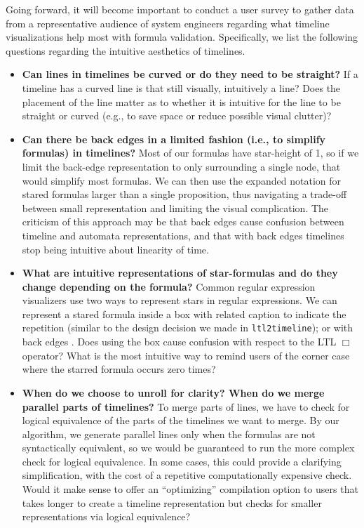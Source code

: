 \documentclass[preprint,12pt]{elsarticle}
\theoremstyle{definition}
\theoremstyle{remark}
\newcommand{\tool}{\hspace{0.1cm}\texttt{ltl2timeline}\hspace{0.1cm}}
\begin{document}
Going forward, it will become important to conduct a user survey to gather data from a representative audience of system engineers regarding what timeline visualizations help most with formula validation. Specifically, we list the following questions regarding the intuitive aesthetics of timelines.
\begin{itemize}
\item {\bf Can lines in timelines be curved or do they need to be straight?} If a timeline has a curved line is that still visually, intuitively a line? Does the placement of the line matter as to whether it is intuitive for the line to be straight or curved (e.g., to save space or reduce possible visual clutter)?

\item {\bf Can there be back edges in a limited fashion (i.e., to simplify formulas) in timelines?} Most of our formulas have star-height of 1, so if we limit the back-edge representation to only surrounding a single node, that would simplify most formulas. We can then use the expanded notation for stared formulas larger than a single proposition, thus navigating a trade-off between small representation and limiting the visual complication. The criticism of this approach may be that back edges cause confusion between timeline and automata representations, and that with back edges timelines stop being intuitive about linearity of time.

\item {\bf What are intuitive representations of star-formulas and do they change depending on the formula?} Common regular expression visualizers use two ways to represent stars in regular expressions. We can represent a stared formula inside a box \cite{B22} with related caption to indicate the repetition (similar to the design decision we made in \tool); or with back edges \cite{A20}. Does using the box cause confusion with respect to the LTL $\Box$ operator? What is the most intuitive way to remind users of the corner case where the starred formula occurs zero times?

\item {\bf When do we choose to unroll for clarity? When do we merge parallel parts of timelines?} To merge parts of lines, we have to check for logical equivalence of the parts of the timelines we want to merge. By our algorithm, we generate parallel lines only when the formulas are not syntactically equivalent, so we would be guaranteed to run the more complex check for logical equivalence. In some cases, this could provide a clarifying simplification, with the cost of a repetitive computationally expensive check. Would it make sense to offer an ``optimizing'' compilation option to users that takes longer to create a timeline representation but checks for smaller representations via logical equivalence?
\end{itemize}
\end{document}
